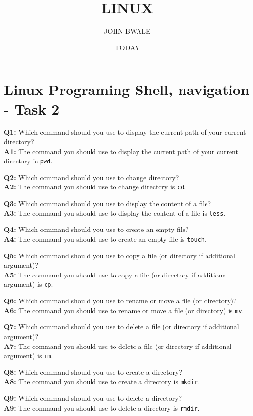 \documentclass{article}
\begin{document}
\title{LINUX}
\author{JOHN BWALE}
\date{TODAY}

\maketitle

\section{  Linux Programing Shell, navigation - Task 2 }
\textbf{Q1:} Which command should you use to display the current path of your current directory? \\
\textbf{A1:} The command you should use to display the current path of your current directory is \texttt{pwd}.

\textbf{Q2:} Which command should you use to change directory? \\
\textbf{A2:} The command you should use to change directory is \texttt{cd}.

\textbf{Q3:} Which command should you use to display the content of a file? \\
\textbf{A3:} The command you should use to display the content of a file is \texttt{less}.

\textbf{Q4:} Which command should you use to create an empty file? \\
\textbf{A4:} The command you should use to create an empty file is \texttt{touch}.

\textbf{Q5:} Which command should you use to copy a file (or directory if additional argument)? \\
\textbf{A5:} The command you should use to copy a file (or directory if additional argument) is \texttt{cp}.

\textbf{Q6:} Which command should you use to rename or move a file (or directory)? \\
\textbf{A6:} The command you should use to rename or move a file (or directory) is \texttt{mv}.

\textbf{Q7:} Which command should you use to delete a file (or directory if additional argument)? \\
\textbf{A7:} The command you should use to delete a file (or directory if additional argument) is \texttt{rm}.

\textbf{Q8:} Which command should you use to create a directory? \\
\textbf{A8:} The command you should use to create a directory is \texttt{mkdir}.

\textbf{Q9:} Which command should you use to delete a directory? \\
\textbf{A9:} The command you should use to delete a directory is \texttt{rmdir}.
\end{document}

